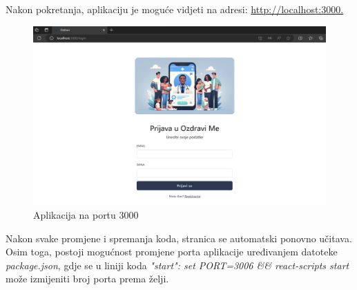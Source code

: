 	\newpage \noindent Nakon pokretanja, aplikaciju je moguće vidjeti na adresi: \url{http://localhost:3000.}\\
	\begin{figure}[H]
		\includegraphics[width=\textwidth]{slike/loc3000.png} 
		\caption{Aplikacija na portu 3000} 
	   \end{figure}
	Nakon svake promjene i spremanja koda, stranica se automatski ponovno učitava. Osim toga, postoji mogućnost promjene porta aplikacije uređivanjem datoteke 
	\textit{package.json}, 
	gdje se u liniji koda 
	\textit{"start": set PORT=3006 \&\& react-scripts start} može izmijeniti broj porta prema želji.
	\eject 